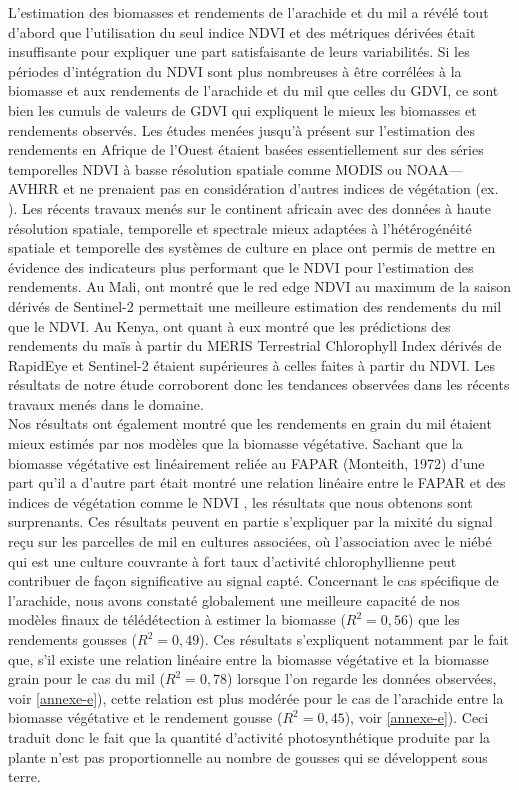L’estimation des biomasses et rendements de l’arachide et du mil a révélé tout d’abord que l’utilisation du seul indice NDVI et des métriques dérivées était insuffisante pour expliquer une part satisfaisante de leurs variabilités. Si les périodes
d’intégration du NDVI sont plus nombreuses à être corrélées à la biomasse et aux rendements de l’arachide et du mil que celles du GDVI, ce sont bien les cumuls de valeurs de GDVI qui expliquent le mieux les biomasses et rendements observés. Les études menées jusqu’à présent sur l’estimation des rendements en Afrique de l’Ouest
étaient basées essentiellement sur des séries temporelles NDVI à basse résolution spatiale comme MODIS ou NOAA---AVHRR et ne prenaient pas en considération d’autres indices de végétation (ex. \citet{Leroux2016, Maselli2000,Rasmussen1997}).
Les récents travaux menés sur le continent africain avec des données à haute résolution spatiale, temporelle et spectrale mieux adaptées à l’hétérogénéité spatiale et temporelle des systèmes de culture en place ont permis de mettre en évidence des indicateurs plus performant que le NDVI pour l’estimation des rendements. Au Mali, \citet{Lambert2018} ont montré que le red edge NDVI au maximum de la saison dérivés de Sentinel-2 permettait une meilleure estimation des rendements du mil que le NDVI. Au Kenya, \citet{Jin2017} ont quant à eux montré que les prédictions des rendements du maïs à partir du MERIS Terrestrial Chlorophyll Index dérivés de RapidEye et Sentinel-2 étaient supérieures à celles faites à partir du NDVI. Les résultats de notre étude corroborent donc les tendances observées dans les récents travaux menés
dans le domaine.
\\Nos résultats ont également montré que les rendements en grain du mil étaient mieux estimés par nos modèles que la biomasse végétative. Sachant que la biomasse végétative est linéairement reliée au FAPAR (Monteith, 1972) d’une part qu’il a d’autre part était montré une relation linéaire entre le FAPAR et des indices de végétation
comme le NDVI \citep{Myneni1994}, les résultats que nous obtenons sont
surprenants. Ces résultats peuvent en partie s’expliquer par la mixité du signal reçu sur les parcelles de mil en cultures associées, où l’association avec le niébé qui est une culture couvrante à fort taux d’activité chlorophyllienne peut contribuer de façon significative au signal capté. Concernant le cas spécifique de l’arachide, nous avons
constaté globalement une meilleure capacité de nos modèles finaux de télédétection à estimer la biomasse ($R^{2} = 0,56$) que les rendements gousses ($R^{2} = 0,49$). Ces résultats s’expliquent notamment par le fait que, s’il existe une relation linéaire entre la biomasse végétative et la biomasse grain pour le cas du mil ($R^{2} = 0,78$) lorsque l’on regarde les données observées, voir \cref{annexe-e}), cette relation est plus modérée pour le cas de l’arachide entre la biomasse végétative et le rendement gousse ($R^{2} = 0,45$), voir \cref{annexe-e}). Ceci traduit donc le fait que la quantité d’activité photosynthétique produite par la plante n’est pas proportionnelle au nombre de gousses qui se développent sous terre.

